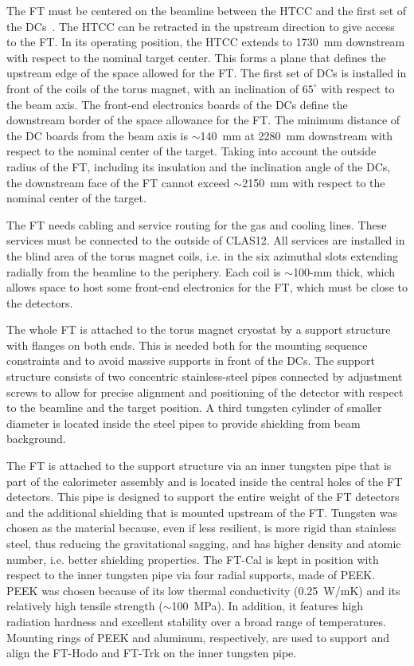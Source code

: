 The FT must be centered on the beamline between the HTCC and the first set of the DCs~\cite{dc}. The HTCC
can be retracted in the upstream direction to give access to the FT. In its operating position, the HTCC extends to
1730~mm downstream with respect to the nominal target center. This forms a plane that defines the upstream edge
of the space allowed for the FT. The first set of DCs is installed in front of the coils of the torus magnet, with an
inclination of $65^\circ$ with respect to the beam axis. The front-end electronics boards of the DCs define the
downstream border of the space allowance for the FT. The minimum distance of the DC boards from the beam axis
is $\sim$140~mm at 2280~mm downstream with respect to the nominal center of the target. Taking into account the
outside radius of the FT, including its insulation and the inclination angle of the DCs, the downstream face of the FT
cannot exceed $\sim$2150~mm with respect to the nominal center of the target.

The FT needs cabling and service routing for the gas and cooling lines. These services must be connected to the
outside of CLAS12. All services are installed in the blind area of the torus magnet coils, i.e. in the six azimuthal
slots extending radially from the beamline to the periphery. Each coil is $\sim$100-mm thick, which allows space
to host some front-end electronics for the FT, which must be close to the detectors.

The whole FT is attached to the torus magnet cryostat by a support structure with flanges on both ends. This is
needed both for the mounting sequence constraints and to avoid massive supports in front of the DCs. The support
structure consists of two concentric stainless-steel pipes connected by adjustment screws to allow for precise
alignment and positioning of the detector with respect to the beamline and the target position. A third tungsten
cylinder of smaller diameter is located inside the steel pipes to provide shielding from beam background. 

The FT is attached to the support structure via an inner tungsten pipe that is part of the calorimeter assembly
and is located inside the central holes of the FT detectors. This pipe is designed to support the entire weight of the
FT detectors and the additional shielding that is mounted upstream of the FT. Tungsten was chosen as the material
because, even if less resilient, is more rigid than stainless steel, thus reducing the gravitational sagging, and has
higher density and atomic number, i.e. better shielding properties. The FT-Cal is kept in position with respect to the
inner tungsten pipe via four radial supports, made of PEEK. PEEK was chosen because of its low thermal conductivity
(0.25~W/mK) and its relatively high tensile strength ($\sim$100~MPa). In addition, it features high radiation
hardness and excellent stability over a broad range of temperatures. Mounting rings of PEEK and aluminum,
respectively, are used to support and align the FT-Hodo and FT-Trk on the inner tungsten pipe.


